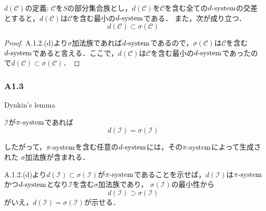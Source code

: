 \documentclass{jsarticle}
\begin{document}
$d(\mathcal{C})$の定義:
$\mathcal{C}$を$S$の部分集合族とし，$d(\mathcal{C})$を$\mathcal{C}$を含む全ての$d{\rm \text{-}system}$の交差とすると，$d(\mathcal{C})$は$\mathcal{C}$を含む最小の$d{\rm \text{-}system}$である．
また，次が成り立つ．
\begin{equation}
    d(\mathcal{C})\subset \sigma(\mathcal{C}) \nonumber
\end{equation}

\begin{itembox}[]{}
    \begin{proof}
        A.1.2.(d)より$\sigma$加法族であれば$d{\rm \text{-}system}$であるので，$\sigma(\mathcal{C})$は$\mathcal{C}$を含む$d{\rm \text{-}system}$であると言える．ここで，$d(\mathcal{C})$は$\mathcal{C}$を含む最小の$d{\rm \text{-}system}$であったので$d(\mathcal{C})\subset \sigma(\mathcal{C})$．
    \end{proof}
\end{itembox}

\subsubsection*{A1.3}
Dynkin's lemma

$\mathcal{I}$が$\pi{\rm \text{-}system}$であれば
\begin{equation}
    d(\mathcal{I})=\sigma(\mathcal{I})
\end{equation}

したがって，$\pi{\rm \text{-}system}$を含む任意の$d{\rm \text{-}system}$には，その$\pi{\rm \text{-}system}$によって生成された $\sigma$加法族が含まれる．

\begin{itembox}[]{}
    A.1.2.(d)より$d(\mathcal{I})\subset \sigma(\mathcal{I})$が$\pi{\rm \text{-}system}$であることを示せば，$d(\mathcal{I})$は$\pi{\rm \text{-}system}$かつ$d{\rm \text{-}system}$となり$\mathcal{I}$を含む$\sigma$加法族であり，
        $\sigma(\mathcal{I})$の最小性から
        \begin{equation}
            d(\mathcal{I})\supset\sigma(\mathcal{I}) \nonumber
        \end{equation}
        がいえ，$d(\mathcal{I})=\sigma(\mathcal{I})$が示せる．
\end{itembox}
\end{document}
